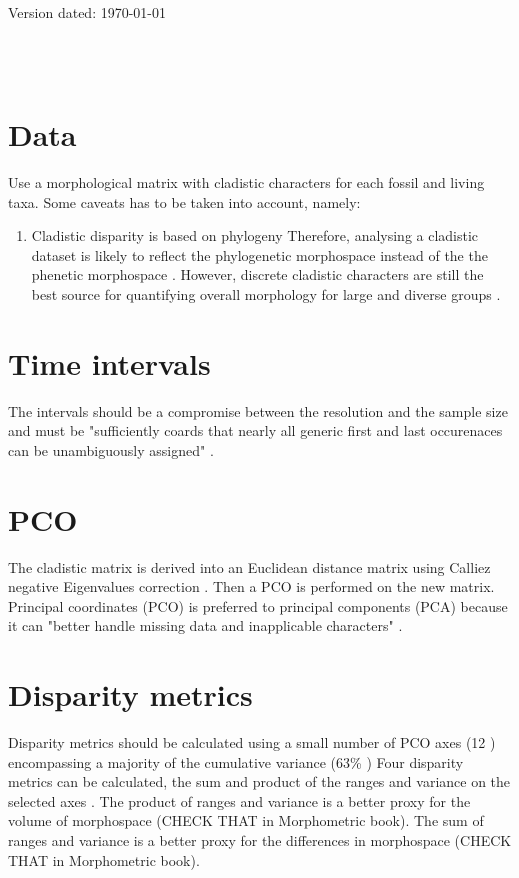 \documentclass[a4paper,11pt]{article}
\begin{document}
\begin{flushright}
Version dated: \today
\end{flushright}
\begin{center}

\\
\bigskip
\\

\end{center}

\section{Data}
Use a morphological matrix with cladistic characters for each fossil and living taxa.
Some caveats has to be taken into account, namely: 
\begin{enumerate}
\item{Cladistic disparity is based on phylogeny}
Therefore, analysing a cladistic dataset is likely to reflect the phylogenetic morphospace instead of the the phenetic morphospace \citep{Foote29111996,Wagner01011997}.
However, discrete cladistic characters are still the best source for quantifying overall morphology for large and diverse groups \citep{Brusatte12092008}.
\end{enumerate}

\section{Time intervals}
The intervals should be a compromise between the resolution and the sample size and must be "sufficiently coards that nearly all generic first and last occurenaces can be unambiguously assigned" \citep{Foote01071994}.

\section{PCO}
The cladistic matrix is derived into an Euclidean distance matrix using Calliez negative Eigenvalues correction \citep{toljagictriassic-jurassic2013}.
Then a PCO is performed on the new matrix.
Principal coordinates (PCO) is preferred to principal components (PCA) because it can "better handle missing data and inapplicable characters" \citep{lofgren2003,Wesley-Hunt2005}.

\section{Disparity metrics}
Disparity metrics should be calculated using a small number of PCO axes (12 \citep{Brusatte12092008}) encompassing a majority of the cumulative variance (63\% \citep{Brusatte12092008})
Four disparity metrics can be calculated, the sum and product of the ranges and variance on the selected axes \citep{Wills1994}.
The product of ranges and variance is a better proxy for the volume of morphospace (CHECK THAT in Morphometric book).
The sum of ranges and variance is a better proxy for the differences in morphospace (CHECK THAT in Morphometric book).
\end{document}
